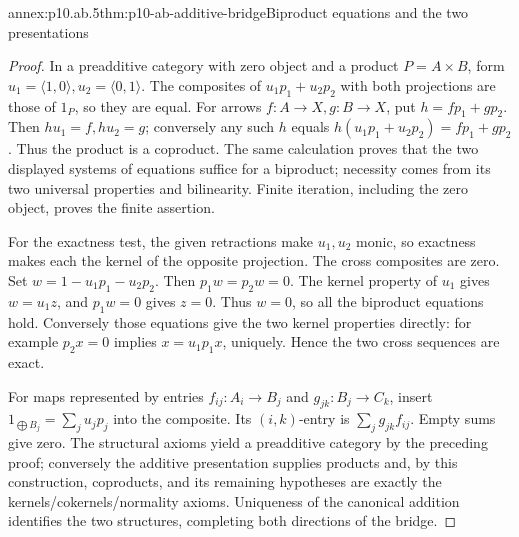 \begin{annexitem}{annex:p10.ab.5}{thm:p10-ab-additive-bridge}{Biproduct equations and the two presentations}
\begin{proof}
In a preadditive category with zero object and a product \(P=A\times B\),
form \(u_1=\langle1,0\rangle,u_2=\langle0,1\rangle\).
The composites of \(u_1p_1+u_2p_2\) with both projections are those
of \(1_P\), so they are equal. For arrows \(f:A\to X,g:B\to X\),
put \(h=fp_1+gp_2\). Then \(hu_1=f,hu_2=g\); conversely any
such \(h\) equals \(h(u_1p_1+u_2p_2)=fp_1+gp_2\).
Thus the product is a coproduct. The same calculation proves that the
two displayed systems of equations suffice for a biproduct; necessity
comes from its two universal properties and bilinearity. Finite
iteration, including the zero object, proves the finite assertion.

For the exactness test, the given retractions make \(u_1,u_2\)
monic, so exactness makes each the kernel of the opposite projection.
The cross composites are zero. Set \(w=1-u_1p_1-u_2p_2\).
Then \(p_1w=p_2w=0\). The kernel property of \(u_1\) gives
\(w=u_1z\), and \(p_1w=0\) gives \(z=0\). Thus \(w=0\),
so all the biproduct equations hold. Conversely those equations give
the two kernel properties directly: for example \(p_2x=0\) implies
\(x=u_1p_1x\), uniquely. Hence the two cross sequences are exact.

For maps represented by entries \(f_{ij}:A_i\to B_j\) and
\(g_{jk}:B_j\to C_k\), insert
\(1_{\bigoplus B_j}=\sum_j u_jp_j\) into the composite. Its
\((i,k)\)-entry is \(\sum_j g_{jk}f_{ij}\). Empty sums give zero.
The structural axioms yield a preadditive category by the preceding
proof; conversely the additive presentation supplies products and,
by this construction, coproducts, and its remaining hypotheses are
exactly the kernels/cokernels/normality axioms. Uniqueness of the
canonical addition identifies the two structures, completing both
directions of the bridge.
\end{proof}
\end{annexitem}

